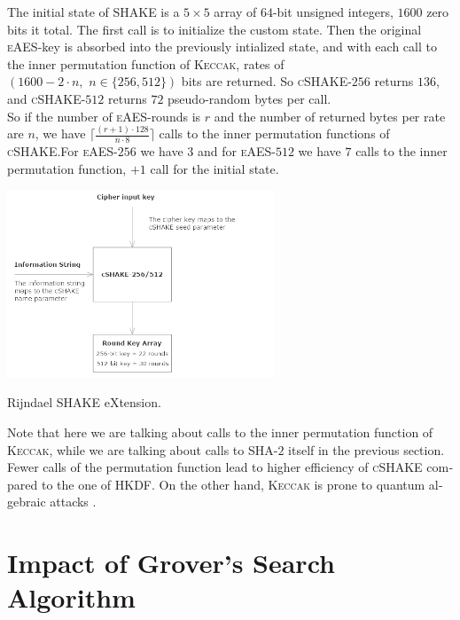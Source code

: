 \documentclass[a4paper,11pt]{article}
\begin{document}
\begin{otherlanguage}{english}
\noindent
The initial state of \textsc{SHAKE} is a $5 \times 5$ array of $64$-bit unsigned integers, $1600$ zero bits it total. The first call is to initialize the custom state. Then the original \textsc{eAES}-key is absorbed into the previously intialized state, and with each call to the inner permutation function of \textsc{Keccak}, rates of $(1600 - 2 \cdot n, \,\,  n \in \{ 256, 512 \})$ bits are returned. So \textsc{cSHAKE}-$256$ returns $136$, and \textsc{cSHAKE}-$512$ returns $72$ pseudo-random bytes per call.\\

\noindent
So if the number of \textsc{eAES}-rounds is $r$ and the number of returned bytes per rate are $n$, we have $\lceil\frac{(r+1) \cdot 128}{n \cdot 8}\rceil$ calls to the inner permutation functions of \textsc{cSHAKE}.For \textsc{eAES}-$256$ we have $3$ and for \textsc{eAES}-$512$ we have $7$ calls to the inner permutation function, $+ 1$ call for the initial state.\\

\begin{figurehere}
  \centering
  \includegraphics[width=8cm]{RSX-schematic.png}
  \caption{Rijndael SHAKE eXtension.\label{abb_4}}
\end{figurehere}

\vspace{0.3cm}

\noindent
Note that here we are talking about calls to the inner permutation function of \textsc{Keccak}, while we are talking about calls to \textsc{SHA}-$2$ itself in the previous section. Fewer calls of the permutation function lead to higher efficiency of \textsc{cSHAKE} compared to the one of \textsc{HKDF}. On the other hand, \textsc{Keccak} is prone to quantum algebraic attacks \cite{QAA}.

\section{Impact of Grover's Search Algorithm}


\end{otherlanguage}
\end{document}
